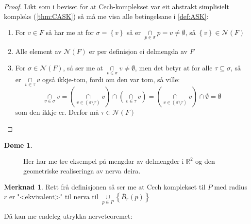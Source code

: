 \documentclass[a4paper, titlepage, 12pt, norsk]{article}
\theoremstyle{plain}
\theoremstyle{definition}
\newtheorem{definition}[theorem]{Definisjon}
\newtheorem{example}[theorem]{Døme}
\newtheorem{remark}[theorem]{Merknad}
\newcommand{\Rb}{\mathbb{R}}
\newcommand{\Nc}{\mathcal{N}}
\newcommand{\intersect}{ \mathop{\cap}\limits } %
\newcommand{\union}{ \mathop{\cup}\limits }
\newcommand{\set}[1]{ \left \{ #1 \right \} } %
\begin{document}
\begin{proof}
	Likt som i beviset for at Cech-komplekset var eit abstrakt simplisielt kompleks (\autoref{thm:CASK}) så må me visa alle betingelsane i \autoref{def:ASK}:
	\begin{enumerate}
		\item{ 
			For \( v \in F \) så har me at for \( \sigma = \set{ v } \) så er \( \intersect_{ p \in \sigma } p = v \neq \emptyset \), så \( \set{v} \in \Nc(F) \) 
		}
		\item{ 
			Alle element av \( \Nc(F) \) er per definisjon ei delmengda av \( F \)
		}
		\item{  
			For \( \sigma \in \Nc(F) \), så ser me at \( \intersect_{v\in\sigma} v \neq \emptyset \), men det betyr at for alle \( \tau \subseteq \sigma \), så er \( \intersect_{v\in\tau} v \) også ikkje-tom, fordi om den var tom, så ville: 
			\[ 
				\intersect_{v\in\sigma} v = \left( \intersect_{v\in(\sigma\setminus\tau)} v \right) \intersect \left( \intersect_{v\in\tau} v \right) = \left( \intersect_{v\in(\sigma\setminus\tau)} v \right) \intersect \emptyset = \emptyset 
			\] 
			som den ikkje er. Derfor må \( \tau \in \Nc(F) \)
		}

	\end{enumerate}
\end{proof}

\begin{example}
	\phantom{abc}
	\begin{figure}[htbp]
		\begin{center}
			
		\end{center}
		\caption{Her har me tre eksempel på mengdar av delmengder i \( \Rb^2 \) og den geometriske realiseringa av nerva deira.}
	\end{figure}
\end{example}

\begin{remark}
	Rett frå definisjonen så ser me at Cech komplekset til $P$ med radius $r$ er "<ekvivalent>" til nerva til $\union_{p \in P} \left \{ \bar{B}_r(p) \right \}$
\end{remark}

Då kan me endeleg utrykka nerveteoremet:

\end{document}
